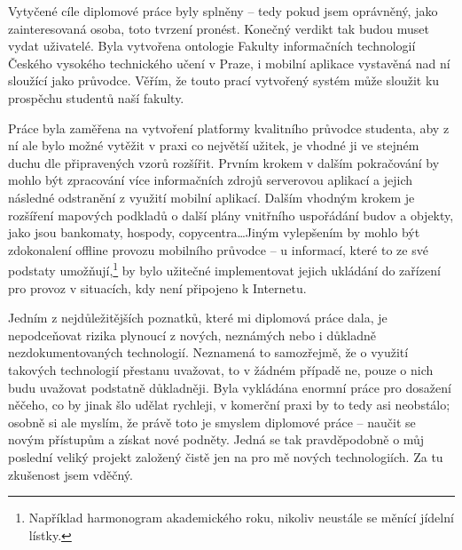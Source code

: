 \begin{conclusion}
Vytyčené cíle diplomové práce byly splněny -- tedy pokud jsem oprávněný, jako zainteresovaná osoba, toto tvrzení pronést. Konečný verdikt tak budou muset vydat uživatelé. Byla vytvořena ontologie Fakulty informačních technologií Českého vysokého technického učení v Praze, i mobilní aplikace vystavěná nad ní sloužící jako průvodce. Věřím, že touto prací vytvořený systém může sloužit ku prospěchu studentů naší fakulty.

Práce byla zaměřena na vytvoření platformy kvalitního průvodce studenta, aby z ní ale bylo možné vytěžit v praxi co největší užitek, je vhodné ji ve stejném duchu dle připravených vzorů rozšířit. Prvním krokem v dalším pokračování by mohlo být zpracování více informačních zdrojů serverovou aplikací a jejich následné odstranění z využití mobilní aplikací. Dalším vhodným krokem je rozšíření mapových podkladů o další plány vnitřního uspořádání budov a objekty, jako jsou bankomaty, hospody, copycentra\dots Jiným vylepšením by mohlo být zdokonalení offline provozu mobilního průvodce -- u informací, které to ze své podstaty umožňují,\footnote{Například harmonogram akademického roku, nikoliv neustále se měnící jídelní lístky.} by bylo užitečné implementovat jejich ukládání do zařízení pro provoz v situacích, kdy není připojeno k Internetu.

Jedním z nejdůležitějších poznatků, které mi diplomová práce dala, je nepodceňovat rizika plynoucí z nových, neznámých nebo i důkladně nezdokumentovaných technologií. Neznamená to samozřejmě, že o využití takových technologií přestanu uvažovat, to v žádném případě ne, pouze o nich budu uvažovat podstatně důkladněji. Byla vykládána enormní práce pro dosažení něčeho, co by jinak šlo udělat rychleji, v komerční praxi by to tedy asi neobstálo; osobně si ale myslím, že právě toto je smyslem diplomové práce -- naučit se novým přístupům a získat nové podněty. Jedná se tak pravděpodobně o můj poslední veliký projekt založený čistě jen na pro mě nových technologiích. Za tu zkušenost jsem vděčný.
\end{conclusion}
